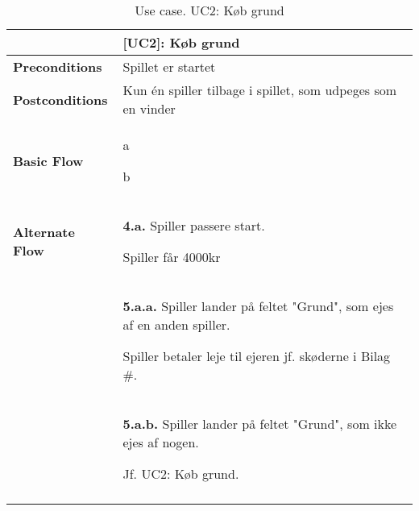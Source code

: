 \documentclass[class=article, crop=false]{standalone}
\begin{document}
        \begin{table}[H]
            \begin{tabularx}{\textwidth}{|l|X|}
                \hline
                & \textbf{[UC2]: Køb grund}   \\ \hline
                \textbf{Preconditions}       & Spillet er startet \\ \hline
                \textbf{Postconditions}      & Kun én spiller tilbage i spillet,
                som udpeges som en vinder\\ \hline


                \textbf{Basic Flow} & \begin{tabenum}
                                          \item a
                                          \item b
                \end{tabenum}   \\ \hline




                \textbf{Alternate Flow}   & \textbf{4.a.} Spiller passere start.
                \begin{enumerate} \begin{tabenum}
                                      \item Spiller får 4000kr
                \end{tabenum} \end{enumerate}
                \\
                & \textbf{5.a.a.} Spiller lander på feltet
                "Grund", som ejes af en anden spiller.
                \begin{enumerate} \begin{tabenum}
                                      \item Spiller betaler leje til ejeren
                                      jf. skøderne i Bilag \#.
                \end{tabenum} \end{enumerate}
                \\
                & \textbf{5.a.b.} Spiller lander på feltet
                "Grund", som ikke ejes af nogen.
                \begin{enumerate} \begin{tabenum}
                                      \item Jf. UC2: Køb grund.
                \end{tabenum} \end{enumerate}
                \\


                \\



                \hline

            \end{tabularx}
            \caption{Use case. UC2: Køb grund}

        \end{table}

    
\end{document}
